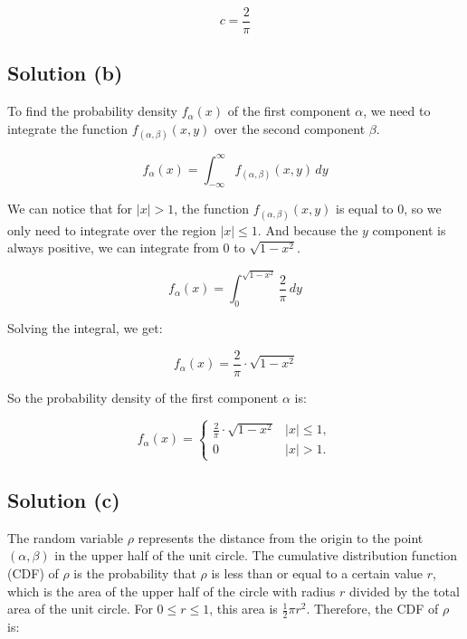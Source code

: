 \begin{equation}
    c = \frac{2}{\pi}
\end{equation}

\subsection*{Solution (b)}

To find the probability density $f_\alpha(x)$ of the first component $\alpha$, we need to integrate the function $f_{(\alpha, \beta)}(x, y)$ over the second component $\beta$.

\begin{equation}
    f_\alpha(x) = \int_{-\infty}^{\infty} f_{(\alpha, \beta)}(x, y) \, dy
\end{equation}

We can notice that for $|x| > 1$, the function $f_{(\alpha, \beta)}(x, y)$
is equal to $0$, so we only need to integrate over the region $|x| \leq 1$.
And because the $y$ component is always positive, we can integrate from $0$ to $\sqrt{1 - x^2}$.

\begin{equation}
    f_\alpha(x) = \int_{0}^{\sqrt{1 - x^2}} \frac{2}{\pi} \, dy
\end{equation}

Solving the integral, we get:

\begin{equation}
    f_\alpha(x) = \frac{2}{\pi} \cdot \sqrt{1 - x^2}
\end{equation}

So the probability density of the first component $\alpha$ is:

\begin{equation}
    f_\alpha(x) =
    \begin{cases}
        \frac{2}{\pi} \cdot \sqrt{1 - x^2} & |x| \leq 1, \\
        0                                  & |x| > 1.
    \end{cases}
\end{equation}

\subsection*{Solution (c)}

The random variable \(\rho\) represents the distance from the origin to the point \((\alpha, \beta)\) in the upper half of the unit circle. The cumulative distribution function (CDF) of \(\rho\) is the probability that \(\rho\) is less than or equal to a certain value \(r\), which is the area of the upper half of the circle with radius \(r\) divided by the total area of the unit circle. For \(0 \leq r \leq 1\), this area is \(\frac{1}{2} \pi r^2\). Therefore, the CDF of \(\rho\) is:

